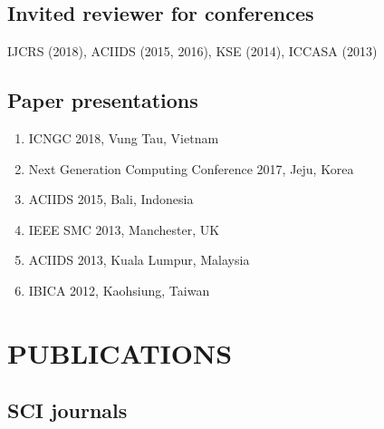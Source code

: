 \documentclass[letterpaper]{article}
\renewenvironment{itemize}{
  \begin{list}{}{
    \setlength{\leftmargin}{1.5em}
  }
}{
  \end{list}
}
\begin{document}
\subsection*{Invited reviewer for conferences}

\begin{itemize}

\item IJCRS (2018), ACIIDS (2015, 2016), KSE (2014), ICCASA (2013)
\end{itemize}

\subsection*{Paper presentations}

\begin{enumerate}

\item ICNGC 2018, Vung Tau, Vietnam
\item Next Generation Computing Conference 2017, Jeju, Korea
\item ACIIDS 2015, Bali, Indonesia 
\item IEEE SMC 2013, Manchester, UK
\item ACIIDS 2013, Kuala Lumpur, Malaysia
\item IBICA 2012, Kaohsiung, Taiwan
\end{enumerate}

\section*{PUBLICATIONS}

\subsection*{SCI journals}
\end{document}
